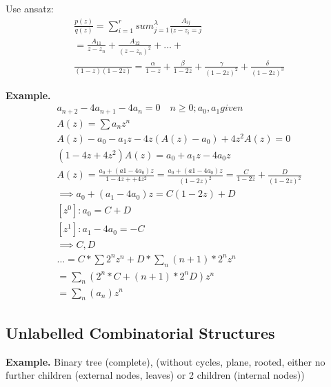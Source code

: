 
Use ansatz: 
\begin{align*}
\frac{p(z)}{q(z)} = \sum_{i=1}^{r} sum_{j=1}^{\lambda} \frac{A_{ij}}{(z-z_i=j} \\
= \frac{A_{11}}{z-z_n} + \frac{A_{12}}{(z-z_n)^2} + \ldots + \\
\frac{}{(1-z)(1-2z)} = \frac{\alpha}{1-z} + \frac{\beta}{1-2z} + \frac{\gamma}{(1-2z)^2} + \frac{\delta}{(1-2z)^3}
\end{align*}

\textbf{Example.}
\begin{align*}
    a_{n+2} - 4 a_{n+1} - 4 a_n = 0 \quad n ≥ 0; a_0, a_1 given \\
    A(z) = \sum a_n z^n \\
    A(z) - a_0 - a_1 z - 4z (A(z)-a_0) + 4z^2 A(z) = 0 \\
    (1-4z + 4z^2) A(z) = a_0 + a_1 z - 4a_0 z \\
    A(z) = \frac{a_0 + (a1 - 4a_0)z}{1- 4z + + 4z^2} = \frac{a_0 + (a1 - 4a_0)z}{(1-2z)^2}
    = \frac{C}{1-2z} + \frac{D}{(1-2z)^2} \\
    \implies a_0 + (a_1 - 4a_0)z = C (1-2z) + D \\
    [z^0]: a_0 = C+D \\
    [z^1]: a_1 - 4a_0 = -C \\
    \implies C, D \\
    \ldots = C * \sum 2^n z^n + D * \sum_n (n+1) *2^n z^n \\
    = \sum_n \left(2^n *C + (n+1)* 2^n D\right) z^n \\
    = \sum_n (a_n) z^n 
\end{align*}




\subsection*{Unlabelled Combinatorial Structures}

\textbf{Example.}
Binary tree (complete), (without cycles, plane, rooted, either no further children (external nodes, leaves) or 2 children (internal nodes))


